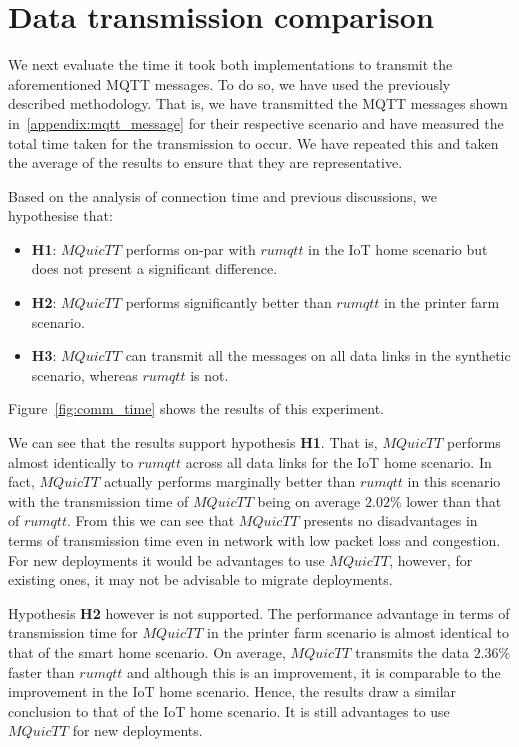 \section{Data transmission comparison}

We next evaluate the time it took both implementations to transmit the aforementioned MQTT messages.
To do so, we have used the previously described methodology.
That is, we have transmitted the MQTT messages shown in~\ref{appendix:mqtt_message} for their respective scenario and have measured the total time taken for the transmission to occur.
We have repeated this and taken the average of the results to ensure that they are representative.

Based on the analysis of connection time and previous discussions, we hypothesise that:

\begin{itemize}
    \item \textbf{H1}: $MQuicTT$ performs on-par with $rumqtt$ in the IoT home scenario but does not present a significant difference.
    \item \textbf{H2}: $MQuicTT$ performs significantly better than $rumqtt$ in the printer farm scenario.
    \item \textbf{H3}: $MQuicTT$ can transmit all the messages on all data links in the synthetic scenario, whereas $rumqtt$ is not.
\end{itemize}

Figure~\ref{fig:comm_time} shows the results of this experiment.

We can see that the results support hypothesis \textbf{H1}.
That is,  $MQuicTT$ performs almost identically to $rumqtt$ across all data links for the IoT home scenario.
In fact, $MQuicTT$ actually performs marginally better than $rumqtt$ in this scenario with the transmission time of $MQuicTT$ being on average $2.02\%$ lower than that of $rumqtt$.
From this we can see that $MQuicTT$ presents no disadvantages in terms of transmission time even in network with low packet loss and congestion.
For new deployments it would be advantages to use $MQuicTT$, however, for existing ones, it may not be advisable to migrate deployments.

Hypothesis \textbf{H2} however is not supported.
The performance advantage in terms of transmission time for $MQuicTT$ in the printer farm scenario is almost identical to that of the smart home scenario.
On average, $MQuicTT$ transmits the data $2.36\%$ faster than $rumqtt$ and although this is an improvement, it is comparable to the improvement in the IoT home scenario.
Hence, the results draw a similar conclusion to that of the IoT home scenario.
It is still advantages to use $MQuicTT$ for new deployments.

